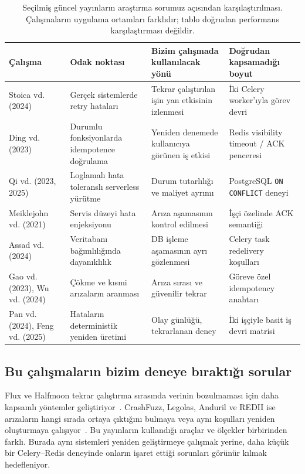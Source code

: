 \documentclass[conference,a4paper]{IEEEtran}
\newcommand{\code}[1]{\texttt{#1}}
\begin{document}
\begin{table}[t]
\caption{Seçilmiş güncel yayınların araştırma sorumuz açısından karşılaştırılması. Çalışmaların uygulama ortamları farklıdır; tablo doğrudan performans karşılaştırması değildir.}
\centering\footnotesize
\begin{tabularx}{\textwidth}{@{}p{29mm}p{42mm}p{43mm}X@{}}
\toprule
\textbf{Çalışma} & \textbf{Odak noktası} & \textbf{Bizim çalışmada kullanılacak yönü} & \textbf{Doğrudan kapsamadığı boyut}\\
\midrule
Stoica vd. (2024)~\cite{stoica2024} & Gerçek sistemlerde retry hataları & Tekrar çalıştırılan işin yan etkisinin izlenmesi & İki Celery worker'ıyla görev devri\\
Ding vd. (2023)~\cite{ding2023} & Durumlu fonksiyonlarda idempotence doğrulama & Yeniden denemede kullanıcıya görünen iş etkisi & Redis visibility timeout / ACK penceresi\\
Qi vd. (2023, 2025)~\cite{qi2023,qi2025} & Loglamalı hata toleranslı serverless yürütme & Durum tutarlılığı ve maliyet ayrımı & PostgreSQL \code{ON CONFLICT} deneyi\\
Meiklejohn vd. (2021)~\cite{meiklejohn2021} & Servis düzeyi hata enjeksiyonu & Arıza aşamasının kontrol edilmesi & İşçi özelinde ACK semantiği\\
Assad vd. (2024)~\cite{assad2024} & Veritabanı bağımlılığında dayanıklılık & DB işleme aşamasının ayrı gözlenmesi & Celery task redelivery koşulları\\
Gao vd. (2023), Wu vd. (2024)~\cite{gao2023,wu2024} & Çökme ve kısmi arızaların aranması & Arıza sırası ve güvenilir tekrar & Göreve özel idempotency anahtarı\\
Pan vd. (2024), Feng vd. (2025)~\cite{pan2024,feng2025} & Hataların deterministik yeniden üretimi & Olay günlüğü, tekrarlanan deney & İki işçiyle basit iş devri matrisi\\
\bottomrule
\end{tabularx}
\label{tab:literature}
\end{table}

\subsection{Bu çalışmaların bizim deneye bıraktığı sorular}
Flux ve Halfmoon tekrar çalıştırma sırasında verinin bozulmaması için daha kapsamlı yöntemler geliştiriyor~\cite{ding2023,qi2023,qi2025}. CrashFuzz, Legolas, Anduril ve REDII ise arızaların hangi sırada ortaya çıktığını bulmaya veya aynı koşulları yeniden oluşturmaya çalışıyor~\cite{gao2023,wu2024,pan2024,feng2025}. Bu yayınların kullandığı araçlar ve ölçekler birbirinden farklı. Burada aynı sistemleri yeniden geliştirmeye çalışmak yerine, daha küçük bir Celery--Redis deneyinde onların işaret ettiği sorunları görünür kılmak hedefleniyor.
\end{document}
